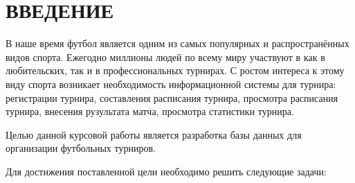 \section*{\centering ВВЕДЕНИЕ}

В наше время футбол является одним из самых популярных и распространённых видов спорта.
Ежегодно миллионы людей по всему миру участвуют в как в любительских, так и в профессиональных турнирах.
С ростом интереса к этому виду спорта возникает необходимость информационной системы для турнира: регистрации турнира, составления расписания турнира, просмотра расписания турнира, внесения рузультата матча, просмотра статистики турнира.

Целью данной курсовой работы является разработка базы данных для организации футбольных турниров.

Для достижения поставленной цели необходимо решить следующие задачи:
